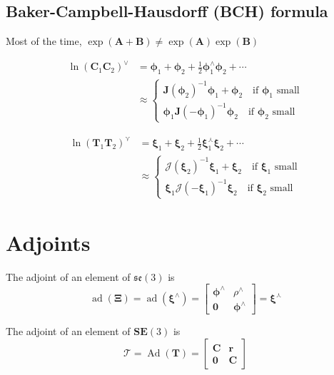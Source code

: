\documentclass[12pt,landscape,a4paper]{article}
\newcommand{\SE}{\mathrm{\mathbf{SE}}}
\newcommand{\se}{\mathfrak{se}}
\newcommand{\vzero}{\bm{0}}
\newcommand{\C}{\bm{C}}
\newcommand{\T}{\bm{T}}
\newcommand{\aT}{\bm{\mathcal{T}}}
\newcommand{\J}{\bm{J}}
\newcommand{\Jc}{\bm{\mathcal{J}}}
\newcommand{\bphi}{\bm{\phi}}
\newcommand{\bxi}{\bm{\xi}}
\newcommand{\bXi}{\bm{\Xi}}
\DeclareMathOperator{\Ad}{Ad}
\DeclareMathOperator{\ad}{ad}
\begin{document}
\begin{multicols*}{3}
\subsection*{Baker-Campbell-Hausdorff (BCH) formula}
Most of the time, $\exp(\mathbf{A}+\mathbf{B}) \not= \exp(\mathbf{A})\exp(\mathbf{B})$

	$$\begin{aligned} \ln(\C_1\C_2)^\vee%
	&= \bphi_1 + \bphi_2 + \frac12 \bphi_1^\wedge\bphi_2 + \cdots \\%
	&\approx
	\begin{cases}
		\J(\bphi_2)^{-1}\bphi_1 + \bphi_2 \quad\text{if $\bphi_1$ small} \\
		\bphi_1 \J(-\bphi_1)^{-1}\bphi_2  \quad\text{if $\bphi_2$ small}
	\end{cases}
	\end{aligned}$$

	$$\begin{aligned} \ln(\T_1\T_2)^\curlyvee%
	&= \bxi_1 + \bxi_2 + \frac12 \bxi_1^\curlywedge\bxi_2 + \cdots \\%
	&\approx
	\begin{cases}
		\Jc(\bxi_2)^{-1}\bxi_1 + \bxi_2 \quad\text{if $\bxi_1$ small} \\
		\bxi_1 \Jc(-\bxi_1)^{-1}\bxi_2  \quad\text{if $\bxi_2$ small}
	\end{cases}
	\end{aligned}$$

\section{Adjoints}
	The adjoint of an element of $\se(3)$ is
	$$ \ad(\bXi) = \ad(\bxi^\wedge) = %
	\begin{bmatrix}
		\bphi^\wedge & \rho^\wedge \\
		\vzero & \bphi^\wedge
	\end{bmatrix} = 
	\bxi^\curlywedge$$

	The adjoint of an element of $\SE(3)$ is
	$$ \aT = \Ad(\T) =%
	\begin{bmatrix}
		\C & \mathbf{r} \\
		\vzero & \C
	\end{bmatrix}$$
	\vspace{-1.5em}

\end{multicols*}
\end{document}
